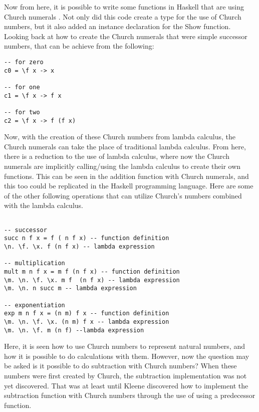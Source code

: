 \documentclass{article}
\begin{document}
Now from here, it is possible to write some functions in Haskell that are using Church numerals \cite{17}.
Not only did this code create a type for the use of Church numbers, but it also added an instance declaration for the Show function.
Looking back at how to create the Church numerals that were simple successor numbers, that can be achieve from the following:
\begin{lstlisting}
-- for zero
c0 = \f x -> x 

-- for one
c1 = \f x -> f x

-- for two
c2 = \f x -> f (f x)
\end{lstlisting}
Now, with the creation of these Church numbers from lambda calculus, the Church numerals can take the place of traditional lambda calculus.
From here, there is a reduction to the use of lambda calculus, where now the Church numerals are implicitly calling/using the lambda calculus to create their own functions.
This can be seen in the addition function with Church numerals, and this too could be replicated in the Haskell programming language.
Here are some of the other following operations that can utilize Church's numbers combined with  the lambda calculus.
\begin{lstlisting}

-- successor
succ n f x = f ( n f x) -- function definition
\n. \f. \x. f (n f x) -- lambda expression

-- multiplication
mult m n f x = m f (n f x) -- function definition
\m. \n. \f. \x. m f  (n f x) -- lambda expression
\m. \n. n succ m -- lambda expression

-- exponentiation
exp m n f x = (n m) f x -- function definition
\m. \n. \f. \x. (n m) f x -- lambda expression
\m. \n. \f. m (n f) --lambda expression

\end{lstlisting}

Here, it is seen how to use Church numbers to represent natural numbers, and how it is possible to do calculations with them.
However, now the question may be asked is it possible to do subtraction with Church numbers?
When these numbers were first created by Church, the subtraction implementation was not yet discovered.
That was at least until Kleene discovered how to implement the subtraction function with Church numbers through the use of using a predecessor function.
\end{document}
